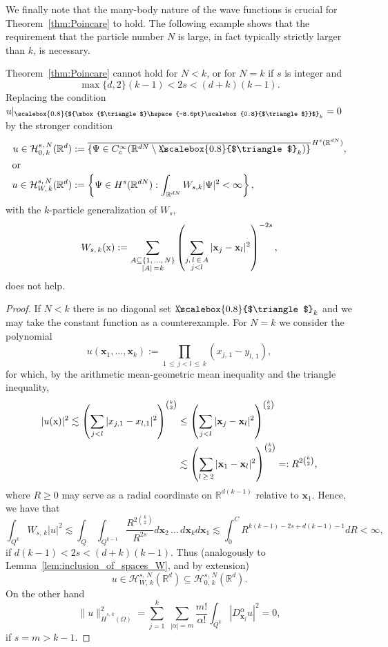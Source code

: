 \documentclass[10pt]{amsart}
\theoremstyle{definition}\newtheorem{defi}[theo]{Definition}\newtheorem{rema}[theo]{Remark}\newtheorem{exam}[theo]{Example}\newtheorem{exem}[theo]{Example}\newtheorem{nota}[theo]{Notation}
\newcommand*\R {\mathbb{R}}
\newcommand\1{{\ensuremath {\mathds 1} }}
\newcommand{\bx}{\mathbf{x}}
\newcommand{\cH}{\mathcal{H}}
\newcommand{\sx}{\textup{x}}
\newcommand{\bDelta}{{\mbox{$\triangle$}\hspace{-8.6pt}\scalebox{0.8}{$\triangle$}}}
\newcommand{\scriptbDelta}{\scalebox{0.8}{$\bDelta$}}
\begin{document}
We finally note that the many-body nature of the wave functions is crucial for Theorem~\ref{thm:Poincare} to hold. The following example shows that the requirement that the particle number $N$ is large, in fact typically strictly larger than $k$, is necessary.

\begin{prop}\label{prop:counterex}
Theorem~\ref{thm:Poincare} cannot hold for $N < k$, or for $N = k$ if $s$ is integer and
\[
\max\{d,2\}(k-1) < 2s < (d+k)(k-1).
\]
Replacing the condition $u\rvert_{\scriptbDelta_k}=0$ by the stronger condition
\begin{align*}
u \in \cH_{0,\,k}^{s,\,N}(\R^d) &:= \overline{\left\{ \Psi \in C_c^\infty(\R^{dN} \setminus \bDelta_k) \right\} }^{\, H^s(\R^{dN})},
\\
\intertext{or}
u \in \cH_{W,\,k}^{s,\,N}(\R^d) &:= \left\{ \Psi \in H^s(\R^{dN}): \int_{\R^{dN}} W_{s,k} |\Psi|^2 < \infty \right\},
\end{align*}
with the $k$-particle generalization of $W_s$,
\[
W_{s,\,k}(\sx) := \sum_{\substack{A \subseteq \{1,\,\ldots,\,N\}\\|A|\,=k}} \left(\sum_{\substack{j,\,l\:\in\,A\\j<l}} |\bx_j-\bx_l|^2 \right)^{-2s},
\]
does not help.
\end{prop}


\begin{proof}
If $N < k$ there is no diagonal set $\bDelta_k$ and we may take the constant function as a counterexample. For $N = k$ we consider the polynomial
\[
u(\bx_1,\ldots,\bx_k) := \prod_{1\,\le\,j<l\,\le\,k} (x_{j,\,1} - y_{l,\,1}),
\]
for which, by the arithmetic mean-geometric mean inequality and the triangle inequality,
\begin{align*}
|u(\sx)|^2 \lesssim \left(\sum_{j<l} |x_{j,1}-x_{l,1}|^2 \right)^{\binom{k}{2}}
&\le \left(\sum_{j<l} |\bx_j-\bx_l|^2 \right)^{\binom{k}{2}}\\
&\lesssim \left(\sum_{l\,\geq\,2} |\bx_1-\bx_l|^2 \right)^{\binom{k}{2}}=: R^{2\binom{k}{2}},
\end{align*}
where $R \ge 0$ may serve as a radial coordinate on $\R^{d(k-1)}$ relative to $\bx_1$. Hence, we have that
\[
\int_{Q^k} W_{s,\,k} |u|^2
\lesssim \int_Q\,\int_{Q^{k-1}} \frac{R^{2\binom{k}{2}}}{R^{2s}} d\bx_2\,\ldots\,d\bx_k d\bx_1
\lesssim \int_0^C R^{k(k-1)-2s+d(k-1)-1} dR < \infty,
\]
if $d(k-1) < 2s < (d+k)(k-1)$. Thus (analogously to Lemma~\ref{lem:inclusion_of_spaces_W}, and by extension)
\[
u \in \cH_{W,\,k}^{s,\,N}(\R^d)
\subseteq \cH_{0,\,k}^{s,\,N}(\R^d).
\]
On the other hand
\[
\|u\|_{\dot{H}^{s,\,k}(\Omega)}^2 = \sum_{j=1}^k\;\sum_{|\alpha|=m} \frac{m!}{\alpha!} \int_{Q^k} \left|D^\alpha_{\bx_j} u\right|^2 = 0,
\]
if $s=m > k-1$.
\end{proof}
\end{document}
